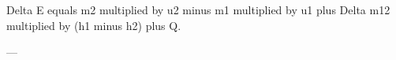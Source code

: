 Delta E equals m2 multiplied by u2 minus m1 multiplied by u1 plus Delta m12 multiplied by (h1 minus h2) plus Q.  

---